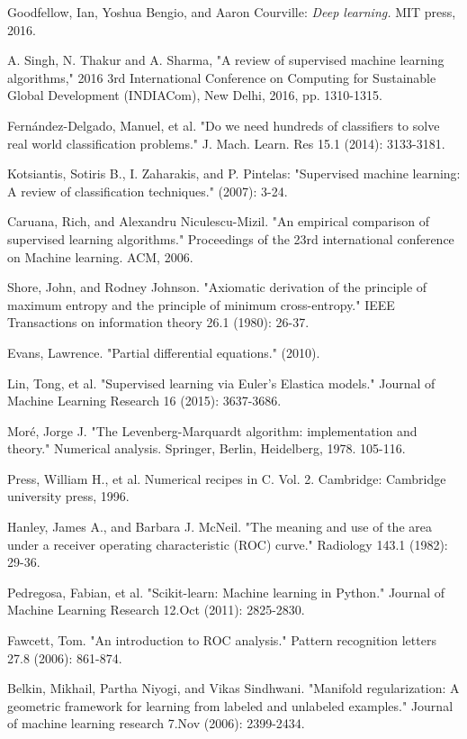 \documentclass{INGUADY}
\begin{document}
\begin{thebibliography}{5}

Goodfellow, Ian, Yoshua Bengio, and Aaron Courville:
\textit{Deep learning.} MIT press, 2016.

A. Singh, N. Thakur and A. Sharma, "A review of supervised machine learning algorithms," 2016 3rd International Conference on Computing for Sustainable Global Development (INDIACom), New Delhi, 2016, pp. 1310-1315.

Fernández-Delgado, Manuel, et al. "Do we need hundreds of classifiers to solve real world classification problems." J. Mach. Learn. Res 15.1 (2014): 3133-3181.

Kotsiantis, Sotiris B., I. Zaharakis, and P. Pintelas: 
"Supervised machine learning: A review of classification techniques." (2007): 3-24.

Caruana, Rich, and Alexandru Niculescu-Mizil. "An empirical comparison of supervised learning algorithms." Proceedings of the 23rd international conference on Machine learning. ACM, 2006.

Shore, John, and Rodney Johnson. "Axiomatic derivation of the principle of maximum entropy and the principle of minimum cross-entropy." IEEE Transactions on information theory 26.1 (1980): 26-37.

Evans, Lawrence. "Partial differential equations." (2010).

Lin, Tong, et al. "Supervised learning via Euler's Elastica models." Journal of Machine Learning Research 16 (2015): 3637-3686.

Moré, Jorge J. "The Levenberg-Marquardt algorithm: implementation and theory." Numerical analysis. Springer, Berlin, Heidelberg, 1978. 105-116.

Press, William H., et al. Numerical recipes in C. Vol. 2. Cambridge: Cambridge university press, 1996.

Hanley, James A., and Barbara J. McNeil. "The meaning and use of the area under a receiver operating characteristic (ROC) curve." Radiology 143.1 (1982): 29-36.

Pedregosa, Fabian, et al. "Scikit-learn: Machine learning in Python." Journal of Machine Learning Research 12.Oct (2011): 2825-2830.

Fawcett, Tom. "An introduction to ROC analysis." Pattern recognition letters 27.8 (2006): 861-874.

Belkin, Mikhail, Partha Niyogi, and Vikas Sindhwani. "Manifold regularization: A geometric framework for learning from labeled and unlabeled examples." Journal of machine learning research 7.Nov (2006): 2399-2434.

\end{thebibliography}
\end{document}
